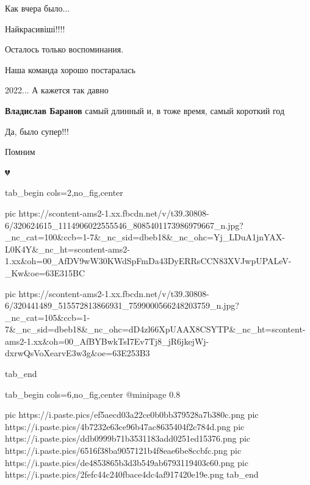 
Как вчера было...


Найкрасивіші!!!!


Осталось только воспоминания.


Наша команда хорошо постаралась


2022... А кажется так давно

\begin{itemize} %
\textbf{Владислав Баранов} самый длинный и, в тоже время, самый короткий год
\end{itemize} %

Да, было супер!!!

Помним

💔


\ifcmt
  tab_begin cols=2,no_fig,center

     pic https://scontent-ams2-1.xx.fbcdn.net/v/t39.30808-6/320624615_1114906022555546_8085401173986979667_n.jpg?_nc_cat=100&ccb=1-7&_nc_sid=dbeb18&_nc_ohc=Yj_LDuA1jnYAX-L0K4Y&_nc_ht=scontent-ams2-1.xx&oh=00_AfDV9wW30KWdSpFmDa43DyERRsCCN83XVJwpUPALeV-_Kw&oe=63E315BC

     pic https://scontent-ams2-1.xx.fbcdn.net/v/t39.30808-6/320441489_515572813866931_7599000566248203759_n.jpg?_nc_cat=105&ccb=1-7&_nc_sid=dbeb18&_nc_ohc=dD4zl66XpUAAX8CSYTP&_nc_ht=scontent-ams2-1.xx&oh=00_AfBYBwkTsI7Ev7Tj8_jR6jkejWj-dxrwQsVoXearvE3w3g&oe=63E253B3

  tab_end
\fi


\ifcmt
  tab_begin cols=6,no_fig,center
     @minipage 0.8

     pic https://i.paste.pics/ef5aecd03a22ce0b0bb379528a7b380c.png
     pic https://i.paste.pics/4b7232e63ce96b47ac8635404f2c784d.png
     pic https://i.paste.pics/ddb0999b71b3531183add0251ed15376.png
     pic https://i.paste.pics/6516f38ba9057121b4f8eae6be8ccbfc.png
     pic https://i.paste.pics/de4853865b3d3b549ab6793119403c60.png
     pic https://i.paste.pics/2fefc44c240fbace4dc4af917420e19e.png
  tab_end
\fi


